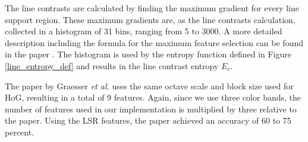 The line contrasts are calculated by finding the maximum gradient for every line support region. These maximum gradients are, as the line contrasts calculation, collected in a histogram of 31 bins, ranging from 5 to 3000. A more detailed description including the formula for the maximum feature selection can be found in the paper \cite{unsalan2004classifying}. The histogram is used by the entropy function defined in Figure \ref{line_entropy_def} and results in the line contrast entropy $E_c$.

The paper by Graesser \textit{et al.} uses the same octave scale and block size used for HoG, resulting in a total of 9 features. Again, since we use three color bands, the number of features used in our implementation is multiplied by three relative to the paper. Using the LSR features, the paper achieved an accuracy of 60 to 75 percent.



